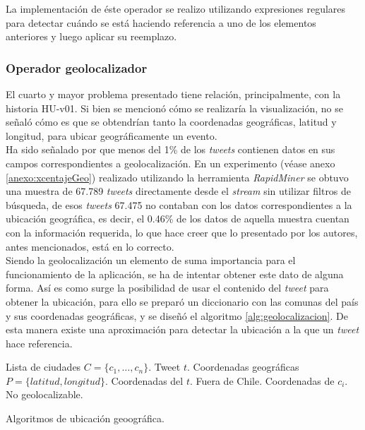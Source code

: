 La implementación de éste operador se realizo utilizando expresiones regulares para detectar cuándo se está haciendo referencia a uno de los elementos anteriores y luego aplicar su reemplazo.

\subsubsection{Operador geolocalizador}
\label{subsubsec:4op}

El cuarto y mayor problema presentado tiene relación, principalmente, con la historia HU-v01. Si bien se mencionó cómo se realizaría la visualización, no se señaló cómo es que se obtendrían tanto la coordenadas geográficas, latitud y longitud, para ubicar geográficamente un evento.\\

Ha sido señalado por \cite{ChatoSurvey} que menos del 1\% de los \textit{tweets} contienen datos en sus campos correspondientes a geolocalización. En un experimento (véase anexo \ref{anexo:xcentajeGeo}) realizado utilizando la herramienta \textit{RapidMiner} se obtuvo una muestra de 67.789 \textit{tweets} directamente desde el \textit{stream} sin utilizar filtros de búsqueda, de esos \textit{tweets} 67.475 no contaban con los datos correspondientes a la ubicación geográfica, es decir, el 0.46\% de los datos de aquella muestra cuentan con la información requerida, lo que hace creer que lo presentado por los autores, antes mencionados, está en lo correcto.\\

Siendo la geolocalización un elemento de suma importancia para el funcionamiento de la aplicación, se ha de intentar obtener este dato de alguna forma. Así es como surge la posibilidad de usar el contenido del \textit{tweet} para obtener la ubicación, para ello se preparó un diccionario con las comunas del país y sus coordenadas geográficas, \cite{ubicacionesChile} y se diseñó el algoritmo \ref{alg:geolocalizacion}. De esta manera existe una aproximación para detectar la ubicación a la que un \textit{tweet} hace referencia.\\


\begin{algorithm}[H]
	\begin{algorithmic}
		\REQUIRE Lista de ciudades $C=\{c_{1}, \dots, c_{n} \}$.
		\REQUIRE Tweet $t$.
		\ENSURE Coordenadas geográficas $P=\{latitud, longitud\}$.
				\RETURN Coordenadas del $t$.
			\ELSE
				\RETURN Fuera de Chile.
			\ENDIF
		\ELSE
				\RETURN Coordenadas de $c_{i}$.
			\ELSE
				\RETURN No geolocalizable.
			\ENDIF
		\ENDIF
	\end{algorithmic}
	\caption{Algoritmos de ubicación geoográfica.}
	\label{alg:geolocalizacion}
\end{algorithm}\vphantom\\

